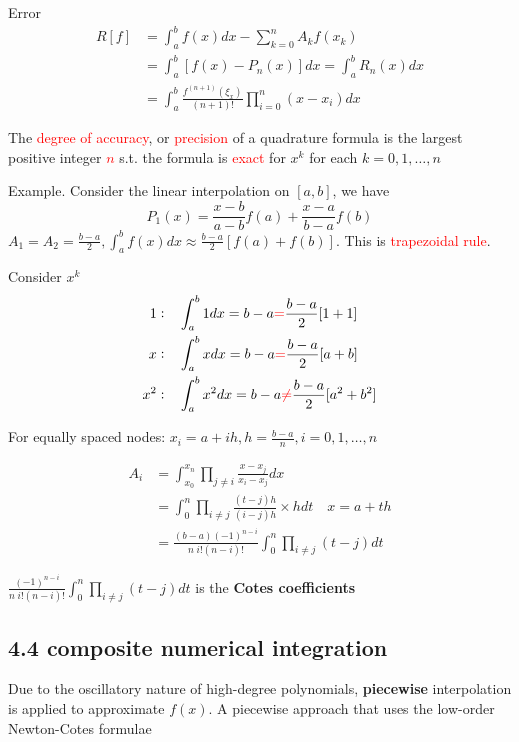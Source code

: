 \documentclass[11pt]{article}
\begin{document}
Error
\begin{align*}
R[f]&=\int_a^bf(x)dx-\displaystyle\sum_{k=0}^nA_kf(x_k)\\
&=\int_a^b[f(x)-P_n(x)]dx=\int_a^bR_n(x)dx\\
&=\int_a^b\frac{f^{(n+1)}(\xi_x)}{(n+1)!}\displaystyle\prod_{i=0}^n(x-x_i)dx
\end{align*}

\begin{definition}
The \textcolor{red}{degree of accuracy}, or \textcolor{red}{precision} of a quadrature
formula is the largest positive integer \textcolor{red}{$n$}   s.t. 
the formula is \textcolor{red}{exact}
for $x^k$ for each $k=0,1,\dots,n$
\end{definition}

Example. Consider the linear interpolation on \([a,b]\), we have 
\begin{equation*}
P_1(x)=\frac{x-b}{a-b}f(a)+\frac{x-a}{b-a}f(b)
\end{equation*}
\(A_1=A_2=\frac{b-a}{2}, \int_a^bf(x)dx\approx\frac{b-a}{2}[f(a)+f(b)]\). This
is \textcolor{red}{trapezoidal rule}.

Consider \(x^k\)
\begin{align*}
1:\quad &\int_a^b1dx=b-a \textcolor{red}{=} \frac{b-a}{2}[1+1]\\
x:\quad &\int_a^bxdx=b-a \textcolor{red}{=}\frac{b-a}{2}[a+b]\\
x^2:\quad &\int_a^bx^2dx=b-a \textcolor{red}{\neq}  \frac{b-a}{2}[a^2+b^2]\\
\end{align*}

For equally spaced nodes: \(x_i=a+ih,h=\frac{b-a}{n}, i=0,1,\dots,n\)

\begin{align*}
A_i&=\int_{x_0}^{x_n}\displaystyle\prod_{j\neq i}\frac{x-x_j}{x_i-x_j}dx\\
&=\int_0^n\displaystyle\prod_{i\neq j}\frac{(t-j)h}{(i-j)h}\times hdt\quad x=a+th\\
&=\frac{(b-a)(-1)^{n-i}}{n\;i!(n-i)!}\int_0^n\displaystyle\prod_{i\neq j}(t-j)dt
\end{align*}

\(\frac{(-1)^{n-i}}{n\;i!(n-i)!}\int_0^n\displaystyle\prod_{i\neq j}(t-j)dt\)
is the \textbf{Cotes coefficients}

\subsection{4.4 composite numerical integration}
\label{sec:orgc20a08d}
Due to the oscillatory nature of high-degree polynomials, \textbf{piecewise}
interpolation is applied to approximate \(f(x)\). A piecewise approach that
uses the low-order Newton-Cotes formulae
\end{document}
